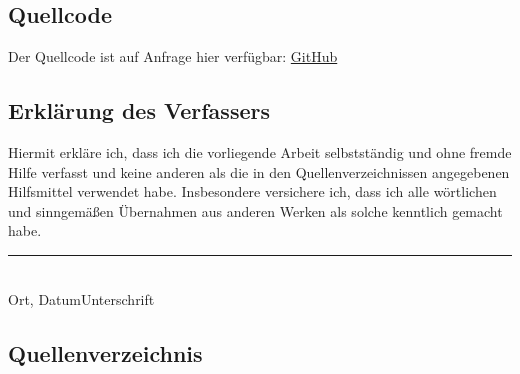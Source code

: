 \documentclass{article}
\begin{document}
    \newpage

    \subsection{Quellcode}
    Der Quellcode ist auf Anfrage hier verfügbar: \href{https://github.com/Katharineum/VanadiumCast}{GitHub}

    \subsection{Erklärung des Verfassers}

    \begin{small}

        Hiermit erkläre ich, dass ich die vorliegende Arbeit selbstständig und ohne fremde Hilfe verfasst und keine anderen als die in den Quellenverzeichnissen angegebenen Hilfsmittel verwendet habe. Insbesondere versichere ich, dass ich alle wörtlichen und sinngemäßen Übernahmen aus anderen Werken als solche kenntlich gemacht habe.

        \vspace{2\baselineskip}
        \noindent
        \rule[0.5ex]{25em}{0.5pt}\\
        Ort, Datum\qquad\qquad\qquad\qquad Unterschrift

    \end{small}

    \newpage

    \subsection{Quellenverzeichnis}
\end{document}
